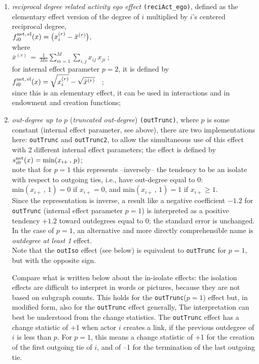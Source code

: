\documentclass[a4paper,fleqn,11pt]{article}
\newcommand{\+}{\, + \,}
\newcommand{\vit}{\theenumi}
\begin{document}
\begin{enumerate}
 \item {\em reciprocal degree related activity ego effect} \texttt{(reciAct\_ego)},
 	 defined as the elementary effect version of the
 degree of $i$ multiplied by $i$'s centered reciprocal degree,\\
 $ f^{\rm net,\, el}_{i\vit}(x)  =  \big( x^{(r)}_{i} - \bar x^{(r)} \big) $, \\
 where \\
 $ \bar x^{(r)}  \,=\, \frac{1}{Mn} \sum_{m=1}^M \sum_{i,j} x_{ij}\,x_{ji} \ ;  $ \\
 for internal effect parameter $p=2$, it is defined by\\
 $f^{\rm net,\, el}_{i\vit}(x)  =   \sqrt{ x^{(r)}_{i}} - \sqrt{\bar x^{(r)}} $ \ ; \\
 since this is an elementary effect, it can be used in interactions
 and in endowment and creation functions;

 \item {\em out-degree up to $p$} (\emph{truncated out-degree}) \texttt{(outTrunc)},
 where $p$ is some constant
 (internal effect parameter, see above),  there are two implementations here:
 \texttt{outTrunc} and \texttt{outTrunc2}, to allow the simultaneous use of this
 effect with 2 different internal effect parameters; the effect is
 defined by  \\
 $s^{\rm net}_{i\vit}(x) = \text{min}(x_{i+}\,,\, p)$;\\
 note that for $p=1$ this represents --inversely-- the tendency to be an isolate
 with respect to outgoing ties, i.e., have out-degree equal to 0:
 $ \text{min}(x_{i+}\,,\, 1) = 0$ if $x_{i+} = 0$, and
 $ \text{min}(x_{i+}\,,\, 1) = 1$ if $x_{i+} \geq 1$.\\
 Since the representation is inverse, a result like a negative coefficient
 $ -1.2$ for \texttt{outTrunc} (internal effect parameter $p=1$) is interpreted
 as a positive tendency $+1.2$ toward outdegrees equal to 0; the standard
 error is unchanged. In the case of $p=1$, an alternative and more directly
 comprehensible name is \emph{outdegree at least 1} effect.\\
 Note that the \texttt{outIso} effect (see below) is equivalent
 to \texttt{outTrunc} for $p=1$, but with the opposite sign.

 Compare what is written below about the in-isolate effects:
     the isolation effects are difficult to interpret in words or pictures,
     because they are not based on subgraph counts.
 This holds for the \texttt{outTrunc}($p=1$) effect but, in modified form,
 also for the \texttt{outTrunc} effect generally,
 The interpretation can best be understood from the change statistics.
 The \texttt{outTrunc} effect has a change statistic of +1 when actor $i$
 creates a link, if the previous outdegree of $i$ is less than $p$.
 For $p=1$, this means a change statistic of +1 for the creation of the
 first outgoing tie of $i$, and of --1 for the termination of the last outgoing tie.


\end{enumerate}
\end{document}
